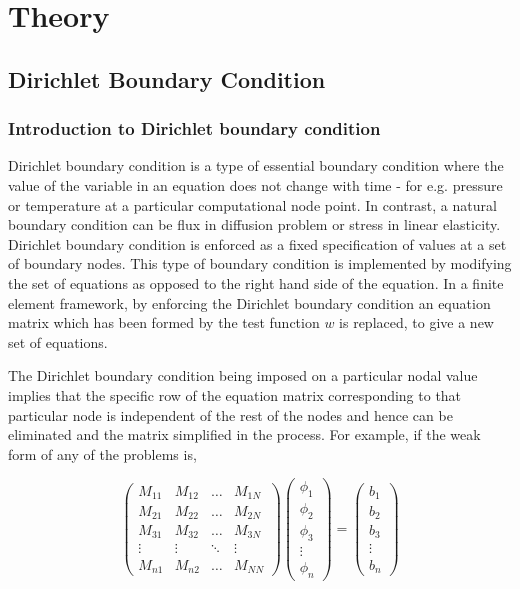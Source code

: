 \section{Theory}

\subsection{Dirichlet Boundary Condition}

\subsubsection{Introduction to Dirichlet boundary condition}

Dirichlet boundary condition is a type of essential boundary condition where the value of the variable in an equation 
does not change with time - for e.g. pressure or temperature at a particular computational node point. 
In contrast, a natural boundary condition can be flux in diffusion problem or stress in linear elasticity. 
Dirichlet boundary condition is enforced as a fixed specification of values at a set of boundary nodes. 
This type of boundary condition is implemented by modifying the set of equations as opposed to the right hand side of the equation.
 In a finite element framework, by enforcing the Dirichlet boundary condition an equation matrix which has been formed 
by the test function $w$ is replaced, to give a new set of equations.

The Dirichlet boundary condition being imposed on a particular nodal value implies that the specific row 
of the equation matrix corresponding to that particular node is independent of the rest of the nodes and hence can
 be eliminated and the matrix simplified in the process. For example, if the weak form of any of the problems is,



\[ \left( \begin{array}{cccc}
M_{11} & M_{12} & \hdots& M_{1N} \\
M_{21} & M_{22} & \hdots& M_{2N} \\
M_{31} & M_{32} & \hdots& M_{3N} \\
 \vdots& \vdots& \ddots& \vdots\\
M_{n1} & M_{n2} & \hdots & M_{NN} \end{array} \right) \left( \begin{array}{c}
\phi_{1} \\
\phi_{2} \\
\phi_{3} \\
 \vdots\\ 
\phi_{n} \end{array} \right) = \left( \begin{array}{c}
b_{1} \\
b_{2} \\
b_{3} \\
 \vdots\\
b_{n} \end{array} \right) \] 



